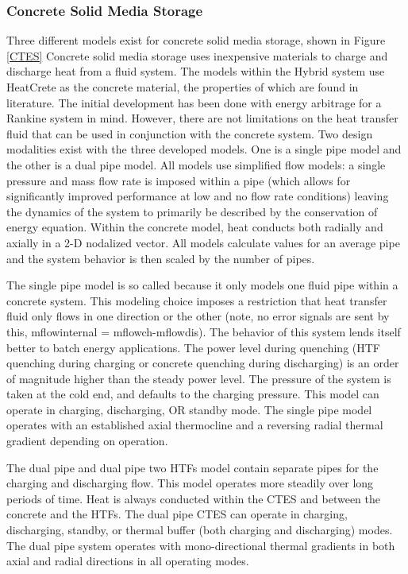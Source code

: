 \subsubsection{Concrete Solid Media Storage}

Three different models exist for concrete solid media storage, shown in Figure \ref{CTES} Concrete solid media storage uses inexpensive materials to charge and discharge heat from a fluid system. The models within the Hybrid system use HeatCrete as the concrete material, the properties of which are found in literature. The initial development has been done with energy arbitrage for a Rankine system in mind. However, there are not limitations on the heat transfer fluid that can be used in conjunction with the concrete system. Two design modalities exist with the three developed models. One is a single pipe model and the other is a dual pipe model. All models use simplified flow models: a single pressure and mass flow rate is imposed within a pipe (which allows for significantly improved performance at low and no flow rate conditions) leaving the dynamics of the system to primarily be described by the conservation of energy equation. Within the concrete model, heat conducts both radially and axially in a 2-D nodalized vector. All models calculate values for an average pipe and the system behavior is then scaled by the number of pipes. 

The single pipe model is so called because it only models one fluid pipe within a concrete system. This modeling choice imposes a restriction that heat transfer fluid only flows in one direction or the other (note, no error signals are sent by this, m\textunderscore flow\textunderscore internal = m\textunderscore flow\textunderscore ch-m\textunderscore flow\textunderscore dis). The behavior of this system lends itself better to batch energy applications. The power level during quenching (HTF quenching during charging or concrete quenching during discharging) is an order of magnitude higher than the steady power level. The pressure of the system is taken at the cold end, and defaults to the charging pressure. This model can operate in charging, discharging, OR standby mode. The single pipe model operates with an established axial thermocline and a reversing radial thermal gradient depending on operation. 

The dual pipe and dual pipe two HTFs model contain separate pipes for the charging and discharging flow. This model operates more steadily over long periods of time. Heat is always conducted within the CTES and between the concrete and the HTFs. The dual pipe CTES can operate in charging, discharging, standby, or thermal buffer (both charging and discharging) modes. The dual pipe system operates with mono-directional thermal gradients in both axial and radial directions in all operating modes. 


